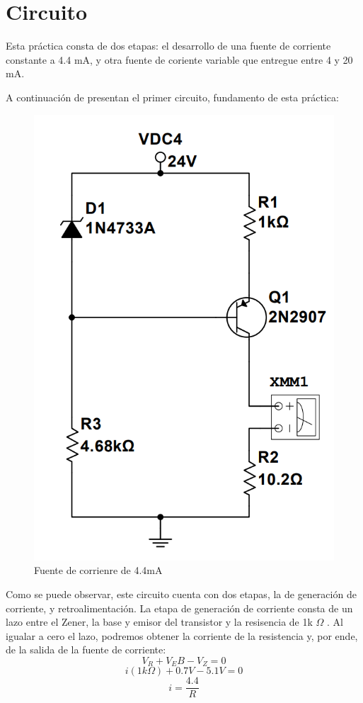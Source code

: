 \documentclass{article}
\begin{document}
\section{Circuito}
Esta práctica consta de dos etapas: el desarrollo de una fuente de corriente constante a 4.4 mA, y otra fuente
 de coriente variable que entregue entre 4 y 20 mA.

A continuación de presentan el primer circuito, fundamento de esta práctica:
\begin{figure}[h]
    \centering
    \includegraphics[scale=0.35]{Screenshot 2022-05-25 012610.png}
    \caption{Fuente de corrienre de 4.4mA}
    \label{Fig: Fuente de corriente de 4.4 mA}
\end{figure}

Como se puede observar, este circuito cuenta con dos etapas, la de generación de corriente, y retroalimentación. La 
etapa de generación de corriente consta de un lazo entre el Zener, la base y emisor del transistor y la resisencia de 
1k \(\Omega\) . Al igualar a cero el lazo, podremos obtener la corriente de la resistencia y, por ende, de la salida de 
la fuente de corriente:
\[ V_R + V_EB - V_Z = 0 \]
\[ i(1k \Omega ) + 0.7V -5.1V = 0 \]
\[ i = \frac{4.4}{R} \]
\end{document}

